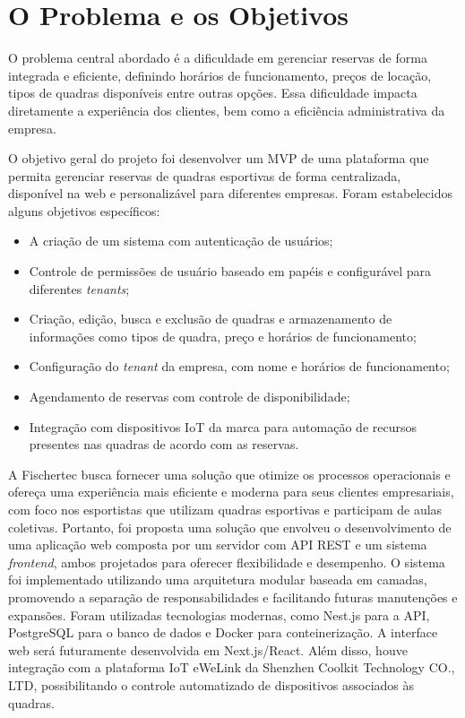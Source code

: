 \section{O Problema e os Objetivos}

O problema central abordado é a dificuldade em gerenciar reservas de forma integrada e eficiente, definindo horários de funcionamento, preços de locação, tipos de quadras disponíveis entre outras opções. Essa dificuldade impacta diretamente a experiência dos clientes, bem como a eficiência administrativa da empresa.

O objetivo geral do projeto foi desenvolver um \gls{MVP} de uma plataforma que permita gerenciar reservas de quadras esportivas de forma centralizada, disponível na web e personalizável para diferentes empresas. Foram estabelecidos alguns objetivos específicos:

\begin{itemize}
    \item A criação de um sistema com autenticação de usuários;
    \item Controle de permissões de usuário baseado em papéis e configurável para diferentes \textit{tenants};
    \item Criação, edição, busca e exclusão de quadras e armazenamento de informações como tipos de quadra, preço e horários de funcionamento;
    \item Configuração do \textit{tenant} da empresa, com nome e horários de funcionamento;
    \item Agendamento de reservas com controle de disponibilidade;
    \item Integração com dispositivos IoT da marca \cite{Sonoff} para automação de recursos presentes nas quadras de acordo com as reservas.
\end{itemize}

A Fischertec busca fornecer uma solução que otimize os processos operacionais e ofereça uma experiência mais eficiente e moderna para seus clientes empresariais, com foco nos esportistas que utilizam quadras esportivas e participam de aulas coletivas. Portanto, foi proposta uma solução que envolveu o desenvolvimento de uma aplicação web composta por um servidor com API REST e um sistema \textit{frontend}, ambos projetados para oferecer flexibilidade e desempenho. O sistema foi implementado utilizando uma arquitetura modular baseada em camadas, promovendo a separação de responsabilidades e facilitando futuras manutenções e expansões. Foram utilizadas tecnologias modernas, como Nest.js para a API, PostgreSQL para o banco de dados e Docker para conteinerização. A interface web será futuramente desenvolvida em Next.js/React. Além disso, houve integração com a plataforma IoT eWeLink da Shenzhen Coolkit Technology CO., LTD, possibilitando o controle automatizado de dispositivos associados às quadras.

